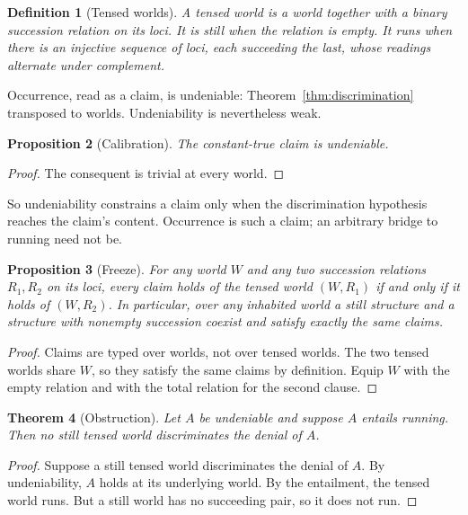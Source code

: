 \documentclass[11pt]{article}
\newtheorem{theorem}{Theorem}[section]
\newtheorem{proposition}[theorem]{Proposition}
\newtheorem{definition}[theorem]{Definition}
\begin{document}
\begin{definition}[Tensed worlds]
\label{def:tensed}
A \emph{tensed world} is a world together with a binary succession relation on
its loci. It is \emph{still} when the relation is empty. It \emph{runs} when
there is an injective sequence of loci, each succeeding the last, whose
readings alternate under complement.
\end{definition}

Occurrence, read as a claim, is undeniable: Theorem~\ref{thm:discrimination}
transposed to worlds. Undeniability is nevertheless weak.

\begin{proposition}[Calibration]
\label{prop:calibration}
The constant-true claim is undeniable.
\end{proposition}

\begin{proof}
The consequent is trivial at every world.
\end{proof}

So undeniability constrains a claim only when the discrimination hypothesis
reaches the claim's content. Occurrence is such a claim; an arbitrary bridge to
running need not be.

\begin{proposition}[Freeze]
\label{prop:freeze}
For any world \(W\) and any two succession relations \(R_1,R_2\) on its loci,
every claim holds of the tensed world \((W,R_1)\) if and only if it holds of
\((W,R_2)\). In particular, over any inhabited world a still structure and a
structure with nonempty succession coexist and satisfy exactly the same claims.
\end{proposition}

\begin{proof}
Claims are typed over worlds, not over tensed worlds. The two tensed worlds
share \(W\), so they satisfy the same claims by definition. Equip \(W\) with
the empty relation and with the total relation for the second clause.
\end{proof}

\begin{theorem}[Obstruction]
\label{thm:obstruction}
Let \(A\) be undeniable and suppose \(A\) entails running. Then no still tensed
world discriminates the denial of \(A\).
\end{theorem}

\begin{proof}
Suppose a still tensed world discriminates the denial of \(A\). By
undeniability, \(A\) holds at its underlying world. By the entailment, the
tensed world runs. But a still world has no succeeding pair, so it does not
run.
\end{proof}
\end{document}
